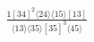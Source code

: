 \documentclass[varwidth, border=5pt]{standalone}
\begin{document}
\begin{my}
$\begin{gathered}
\scriptscriptstyle\frac{1[34]^2⟨24⟩⟨15⟩[13]}{⟨13⟩⟨35⟩[35]^3⟨45⟩}
\end{gathered}$
\end{my}
\end{document}
